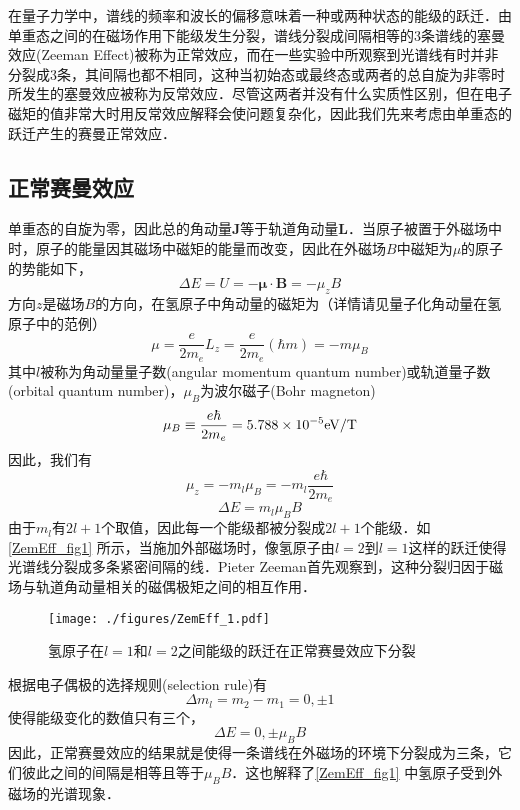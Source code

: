 

在量子力学中，谱线的频率和波长的偏移意味着一种或两种状态的能级的跃迁．由单重态之间的在磁场作用下能级发生分裂，谱线分裂成间隔相等的3条谱线的塞曼效应(Zeeman Effect)被称为正常效应，而在一些实验中所观察到光谱线有时并非分裂成3条，其间隔也都不相同，这种当初始态或最终态或两者的总自旋为非零时所发生的塞曼效应被称为反常效应．尽管这两者并没有什么实质性区别，但在电子磁矩的值非常大时用反常效应解释会使问题复杂化，因此我们先来考虑由单重态的跃迁产生的赛曼正常效应．

\subsection{正常赛曼效应}
单重态的自旋为零，因此总的角动量$\mathbf{J}$等于轨道角动量$\mathbf{L}$．当原子被置于外磁场中时，原子的能量因其磁场中磁矩的能量而改变，因此在外磁场$B$中磁矩为$\mu$的原子的势能如下，
$$\Delta E=U = -\boldsymbol\mu\cdot \mathbf{B}=-\mu_z B$$方向$z$是磁场$B$的方向，在氢原子中角动量的磁矩为（详情请见量子化角动量在氢原子中的范例）$$\mu=\frac{e}{2m_e}L_z=\frac{e}{2m_e}(\hbar m)=-m\mu_B$$
其中$l$被称为角动量量子数(angular momentum quantum number)或轨道量子数(orbital quantum number)，$\mu_B$为波尔磁子(Bohr magneton)
$$\mu_B\equiv\frac{e\hbar}{2m_e}=5.788\times 10^{-5}\rm{eV/T}$$
因此，我们有$$\mu_z=-m_l\mu_B=-m_l\frac{e\hbar}{2m_e}$$
\begin{equation}
\boxed{\Delta E = m_l\mu_B B}
\end{equation}
由于$m_l$有$2l+1$个取值，因此每一个能级都被分裂成$2l+1$个能级．如\autoref{ZemEff_fig1} 所示，当施加外部磁场时，像氢原子由$l=2$到$l=1$这样的跃迁使得光谱线分裂成多条紧密间隔的线．Pieter Zeeman首先观察到，这种分裂归因于磁场与轨道角动量相关的磁偶极矩之间的相互作用．
\begin{figure}[ht]
\centering
\texttt{[image: ./figures/ZemEff\_1.pdf]}
\caption{氢原子在$l=1$和$l=2$之间能级的跃迁在正常赛曼效应下分裂} \label{ZemEff_fig1}
\end{figure}
根据电子偶极的选择规则(selection rule)有
$$
\Delta m_l = m_2-m_1=0,\pm 1
$$
使得能级变化的数值只有三个，
$$
\Delta E = 0,\pm \mu_B B
$$
因此，正常赛曼效应的结果就是使得一条谱线在外磁场的环境下分裂成为三条，它们彼此之间的间隔是相等且等于$\mu_B B$．这也解释了\autoref{ZemEff_fig1} 中氢原子受到外磁场的光谱现象．

